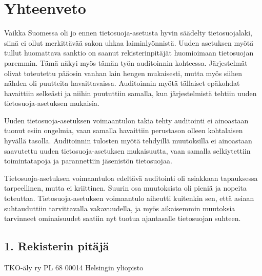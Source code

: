 \documentclass[finnish]{tktltiki}
\begin{document}
\newpage

\section{Yhteenveto}
Vaikka Suomessa oli jo ennen tietosuoja-asetusta hyvin säädelty tietosuojalaki, siinä ei ollut merkittävää sakon uhkaa laiminlyönnistä. Uuden asetuksen myötä tullut huomattava sanktio on saanut rekisterinpitäjät huomioimaan tietosuojan paremmin. Tämä näkyi myös tämän työn auditoinnin kohteessa. Järjestelmät olivat toteutettu pääosin vanhan lain hengen mukaisesti, mutta myös siihen nähden oli puutteita havaittavaissa. Auditoinnin myötä tällaiset epäkohdat havaittiin selkeästi ja niihin puututtiin samalla, kun järjestelmistä tehtiin uuden tietosuoja-asetuksen mukaisia. 

Uuden tietosuoja-asetuksen voimaantulon takia tehty auditointi ei ainoastaan tuonut esiin ongelmia, vaan samalla havaittiin perustason olleen kohtalaisen hyvällä tasolla. Auditoinnin tulosten myötä tehdyillä muutoksilla ei ainoastaan saavutettu uuden tietosuoja-asetuksen mukaisuutta, vaan samalla selkiytettiin toimintatapoja ja parannettiin jäsenistön tietosuojaa.

Tietosuoja-asetuksen voimaantuloa edeltävä auditointi oli asiakkaan tapauksessa tarpeellinen, mutta ei kriittinen. Suurin osa muutoksista oli pieniä ja nopeita toteuttaa. Tietosuoja-asetuksen voimaantulo aiheutti kuitenkin sen, että asiaan suhtauduttiin tarvittavalla vakavuudella, ja myös aikaisemmin muutoksia tarvinneet ominaisuudet saatiin nyt tuotua ajantasalle tietosuojan suhteen.


\newpage
\nocite{*}
%
% 

%

%



\lastpage



\pagestyle{empty}

\appendices


\subsection*{1. Rekisterin pitäjä}
TKO-äly ry
PL 68
00014 Helsingin yliopisto
\end{document}
